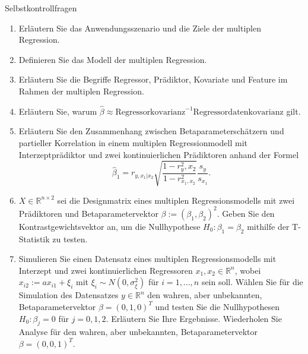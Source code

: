 \documentclass[
  8pt,
  ignorenonframetext,
]{beamer}
\begin{document}
\begin{frame}{Selbstkontrollfragen}
\protect\hypertarget{selbstkontrollfragen}{}
\footnotesize
\begin{enumerate}
\justifying
\item Erläutern Sie das Anwendungsszenario und die Ziele der multiplen Regression.
\item Definieren Sie das Modell der multiplen Regression.
\item Erläutern Sie die Begriffe Regressor, Prädiktor, Kovariate und Feature im Rahmen der multiplen Regression.
\item Erläutern Sie, warum $\hat{\beta} \approx \mbox{Regressorkovarianz}^{-1} \mbox{Regressordatenkovarianz}$ gilt.
\item Erläutern Sie den Zusammenhang zwischen Betaparameterschätzern und partieller Korrelation in einem multiplen
Regressionmodell mit Interzeptprädiktor und zwei kontinuierlichen Prädiktoren anhand der Formel
\begin{equation}
\hat{\beta}_1 = r_{y,x_1|x_2}\sqrt{\frac{1 -r_y^2,x_2}{1 -r_{x_1,x_2}^2}}\frac{s_y}{s_{x_1}}.
\end{equation}
\item $X \in \mathbb{R}^{n \times 2}$ sei die Designmatrix eines multiplen Regressionsmodells mit zwei Prädiktoren
und Betaparametervektor $\beta := (\beta_1,\beta_2)^2$. Geben Sie den Kontrastgewichtsvektor an, 
um die Nullhypothese $H_0 : \beta_1 = \beta_2$ mithilfe der T-Statistik zu testen.
\item Simulieren Sie einen Datensatz eines multiplen Regressionsmodells mit Interzept und
zwei kontinuierlichen Regressoren $x_{1},x_{2} \in \mathbb{R}^n$, wobei $x_{i2} := ax_{i1} + \xi_i$ mit $\xi_i \sim N(0,\sigma^2_{\xi})$  für  $i = 1,...,n$
sein soll. Wählen Sie für die Simulation des Datensatzes $y \in \mathbb{R}^n$ 
den wahren, aber unbekannten, Betaparametervektor $\beta = (0,1,0)^T$ und testen Sie
die Nullhypothesen $H_0 : \beta_j = 0$ für $j = 0,1,2$. Erläutern Sie Ihre Ergebnisse.
Wiederholen Sie Analyse für den wahren, aber unbekannten, Betaparametervektor $\beta = (0,0,1)^T$.
\end{enumerate}
\end{frame}
\end{document}
